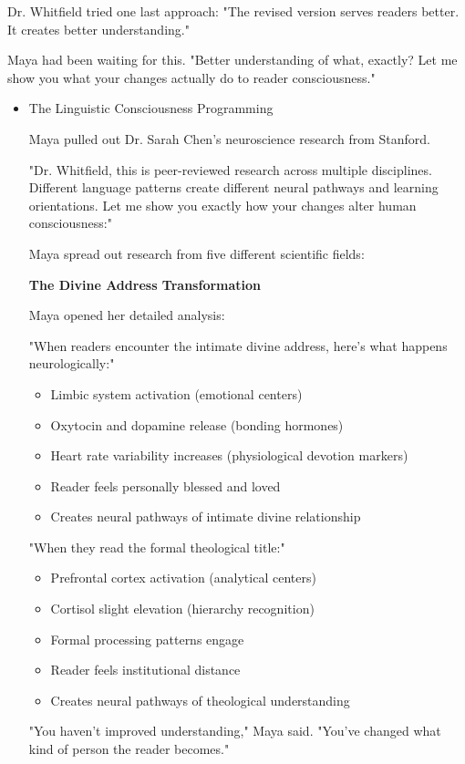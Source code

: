 \documentclass[11pt,twoside]{book}
\begin{document}
Dr. Whitfield tried one last approach: "The revised version serves readers better. It creates better understanding."

Maya had been waiting for this. "Better understanding of what, exactly? Let me show you what your changes actually do to reader consciousness."
\begin{itemize}
\item The Linguistic Consciousness Programming
\label{sec:org380856c}

Maya pulled out Dr. Sarah Chen's neuroscience research from Stanford.

"Dr. Whitfield, this is peer-reviewed research across multiple disciplines. Different language patterns create different neural pathways and learning orientations. Let me show you exactly how your changes alter human consciousness:"

Maya spread out research from five different scientific fields:

\textbf{\textbf{The Divine Address Transformation}}

Maya opened her detailed analysis:

"When readers encounter the intimate divine address, here's what happens neurologically:"
\begin{itemize}
\item Limbic system activation (emotional centers)
\item Oxytocin and dopamine release (bonding hormones)
\item Heart rate variability increases (physiological devotion markers)
\item Reader feels personally blessed and loved
\item Creates neural pathways of intimate divine relationship
\end{itemize}

"When they read the formal theological title:"
\begin{itemize}
\item Prefrontal cortex activation (analytical centers)
\item Cortisol slight elevation (hierarchy recognition)
\item Formal processing patterns engage
\item Reader feels institutional distance
\item Creates neural pathways of theological understanding
\end{itemize}

"You haven't improved understanding," Maya said. "You've changed what kind of person the reader becomes."


\end{itemize}
\end{document}
